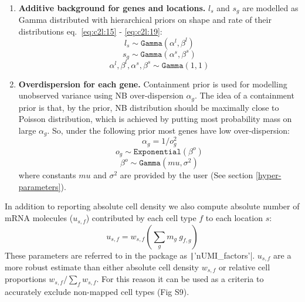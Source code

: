 \documentclass[11pt,a4paper]{article}
\begin{document}
\begin{enumerate}
    \item \textbf{Additive background for genes and locations.} $l_s$ and $s_{g}$ are modelled as Gamma distributed with hierarchical priors on shape and rate of their distributions eq.~\eqref{eq:c2l:15} - \eqref{eq:c2l:19}:
    \begin{equation} \label{eq:c2l:15}
    l_s \sim \mathtt{Gamma}(\alpha^l,  \beta^l)
    \end{equation}
    \begin{equation} \label{eq:c2l:18}
    s_{g} \sim \mathtt{Gamma}(\alpha^s,  \beta^s)
    \end{equation}
    \begin{equation} \label{eq:c2l:19}
    \alpha^l, \beta^l, \alpha^s, \beta^s \sim \mathtt{Gamma}(1, 1)
    \end{equation}
    
    \item \textbf{Overdispersion for each gene.} Containment prior \autocite{simpson_penalising_2017} is used for modelling unobserved variance using NB over-dispersion $\alpha_g$. The idea of a containment prior is that, by the prior, NB distribution should be maximally close to Poisson distribution, which is achieved by putting most probability mass on large $\alpha_g$. So, under the following prior most genes have low over-dispersion:
    \begin{equation} \label{eq:c2l:21}
    \alpha_g = 1 / o_g ^ 2
    \end{equation}
    \begin{equation} \label{eq:c2l:22}
    o_g \sim \mathtt{Exponential}(\beta^o)
    \end{equation}
    \begin{equation} \label{eq:c2l:23}
    \beta^o \sim \mathtt{Gamma}(mu, \sigma^2)
    \end{equation}
    where constants $mu$ and $\sigma^2$ are provided by the user (See section \ref{hyper-parameters}).

\end{enumerate}


In addition to reporting absolute cell density we also compute absolute number of mRNA molecules ($u_{s,f}$) contributed by each cell type $f$ to each location $s$:
\begin{equation} \label{eq:c2l:24}
u_{s,f} = w_{s,f} (\sum_{g} {m_{g} \: g_{f,g}})
\end{equation}
These parameters are referred to in the package as \texttt|'nUMI_factors'|. $u_{s,f}$ are a more robust estimate than either absolute cell density $w_{s,f}$ or relative cell proportions $w_{s,f} / \sum_{f} w_{s,f}$. For this reason it can be used as a criteria to accurately exclude non-mapped cell types (Fig S9). \newline
\end{document}
